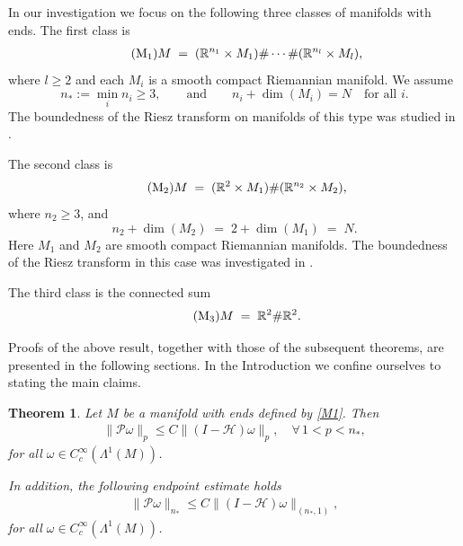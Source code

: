 \documentclass[12pt]{amsart}
\newtheorem{theorem}{Theorem}[section]
\begin{document}



In our investigation we focus on the following three classes of manifolds with ends.
The first class is
\begin{align}\label{M1}\tag{$\textrm{M}_1$}
    M \;=\; (\mathbb{R}^{n_1} \times M_1) \# \cdots \# (\mathbb{R}^{n_l} \times M_l),
\end{align}
where $l \geq 2$ and each $M_i$ is a smooth compact Riemannian manifold. We assume
\[
n_* := \min_i n_i \geq 3, 
\qquad \text{and} \qquad 
n_i + \dim(M_i) = N \quad \text{for all } i.
\]
The boundedness of the Riesz transform on manifolds of this type was studied in \cite{CCH,HS}.

The second class is
\begin{align}\label{M2}\tag{$\textrm{M}_2$}
    M \;=\; (\mathbb{R}^2 \times M_1) \# (\mathbb{R}^{n_2} \times M_2),
\end{align}
where $n_2 \geq 3$, and
\[
n_2 + \dim(M_2) \;=\; 2 + \dim(M_1) \;=\; N.
\]
Here $M_1$ and $M_2$ are smooth compact Riemannian manifolds. The boundedness of the Riesz transform in this case was investigated in \cite{HNS}.

The third class is the connected sum
\begin{align}\label{M3}\tag{$\textrm{M}_3$}
    M \;=\; \mathbb{R}^2 \# \mathbb{R}^2.
\end{align}

Proofs of the above result, together with those of the subsequent theorems, are presented in the following sections. In the Introduction we confine ourselves to stating the main claims.




\begin{theorem}\label{thm1}
Let $M$ be a manifold with ends defined by \eqref{M1}. Then
\begin{align}\label{eq_main}
    \|\mathcal{P}\omega\|_p \le C \|(I-\mathcal{H})\omega \|_p,\quad \forall\, 1<p<n_*,
\end{align}
for all $\omega \in C_c^\infty(\Lambda^1(M))$.

In addition, the following endpoint estimate holds
\begin{align}
    \|\mathcal{P}\omega\|_{n_*} \le C \|(I-\mathcal{H})\omega \|_{(n_*,1)},
\end{align}
for all $\omega \in C_c^\infty(\Lambda^1(M))$.

\end{theorem}
\end{document}
